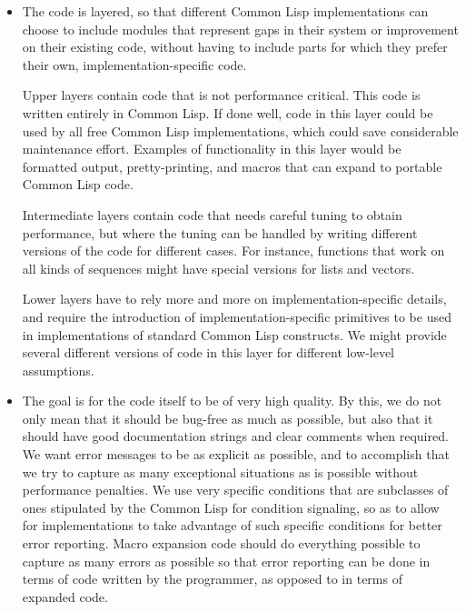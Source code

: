 \begin{itemize}
\item The code is layered, so that different Common Lisp
  implementations can choose to include \sysname{} modules that
  represent gaps in their system or improvement on their existing
  code, without having to include parts for which they prefer their
  own, implementation-specific code. 

  Upper layers contain code that is not performance critical.  This
  code is written entirely in Common Lisp.  If done well, code in this
  layer could be used by all free Common Lisp implementations, which
  could save considerable maintenance effort.  Examples of
  functionality in this layer would be formatted output,
  pretty-printing, and macros that can expand to portable Common Lisp
  code.

  Intermediate layers contain code that needs careful tuning to
  obtain performance, but where the tuning can be handled by writing
  different versions of the code for different cases.  For instance,
  functions that work on all kinds of sequences might have special
  versions for lists and vectors.

  Lower layers have to rely more and more on implementation-specific
  details, and require the introduction of implementation-specific
  primitives to be used in implementations of standard Common Lisp
  constructs.  We might provide several different versions of code in
  this layer for different low-level assumptions.

\item The goal is for the code itself to be of very high quality.
  By this, we do not only mean that it should be bug-free as much as
  possible, but also that it should have good documentation strings
  and clear comments when required.  We want error messages to be as
  explicit as possible, and to accomplish that we try to capture as
  many exceptional situations as is possible without performance
  penalties.  We use very specific conditions that are subclasses of
  ones stipulated by the Common Lisp \hs{} for condition
  signaling, so as to allow for implementations to take advantage of
  such specific conditions for better error reporting.  Macro
  expansion code should do everything possible to capture as many
  errors as possible so that error reporting can be done in terms of
  code written by the programmer, as opposed to in terms of expanded
  code.

\end{itemize}

